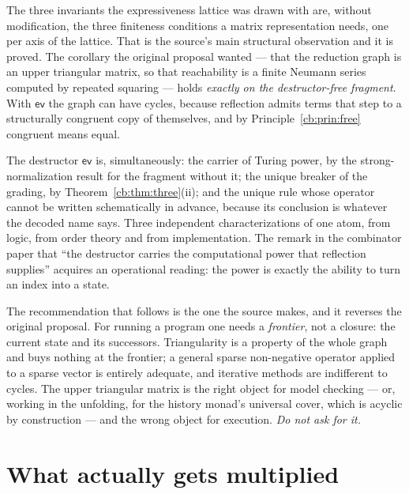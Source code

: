 The three invariants the expressiveness lattice was drawn with are, without modification,
the three finiteness conditions a matrix representation needs, one per axis of the lattice.
That is the source's main structural observation and it is proved. The corollary the
original proposal wanted --- that the reduction graph is an upper triangular matrix, so
that reachability is a finite Neumann series computed by repeated squaring --- holds
\emph{exactly on the destructor-free fragment}. With $\mathsf{ev}$ the graph can have
cycles, because reflection admits terms that step to a structurally congruent copy of
themselves, and by Principle~\ref{cb:prin:free} congruent means equal.

\begin{remark}
\label{cb:rmk:evthrice}
The destructor $\mathsf{ev}$ is, simultaneously: the carrier of Turing power, by the
strong-normalization result for the fragment without it; the unique breaker of the
grading, by Theorem~\ref{cb:thm:three}(ii); and the unique rule whose operator cannot be
written schematically in advance, because its conclusion is whatever the decoded name
says. Three independent characterizations of one atom, from logic, from order theory and
from implementation. The remark in the combinator paper that ``the destructor carries the
computational power that reflection supplies'' acquires an operational reading: the power
is exactly the ability to turn an index into a state.
\end{remark}

The recommendation that follows is the one the source makes, and it reverses the original
proposal. For running a program one needs a \emph{frontier}, not a closure: the current
state and its successors. Triangularity is a property of the whole graph and buys nothing
at the frontier; a general sparse non-negative operator applied to a sparse vector is
entirely adequate, and iterative methods are indifferent to cycles. The upper triangular
matrix is the right object for model checking --- or, working in the unfolding, for the
history monad's universal cover, which is acyclic by construction --- and the wrong object
for execution. \emph{Do not ask for it.}

\section{What actually gets multiplied}
\label{cb:sec:multiply}

